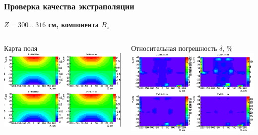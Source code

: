 \documentclass[svgnames] {beamer}
\begin{document}
\begin{frame}
  \frametitle{Проверка качества экстраполяции}
  \begin{block}{\centering \bf $Z = 300 ~..~ 316$ см, компонента $B_{z}$}
    \begin{columns}[c]
      \begin{block}{\centering Карта поля}
        \centering \includegraphics[width=1.0\linewidth]{Bz_fieldMap_new.png}
      \end{block}
      \begin{block}{\footnotesize Относительная погрешность \centering $\delta$, \%}
        \centering \includegraphics[width=1.0\linewidth]{Bz_diff_overlap_reg_new.png}
      \end{block}
    \end{columns}
  \end{block} 
\end{frame}
\end{document}
